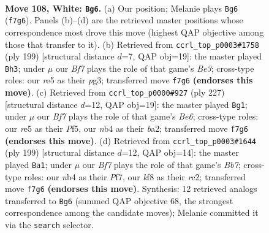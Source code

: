 \documentclass[11pt]{article}
\begin{document}
\clearpage

\begin{figure}[p]\centering
\begin{subfigure}{0.46\textwidth}\centering
\resizebox{\linewidth}{!}{%
\newchessgame
\chessboard[
  setfen={5k2/5B2/8/4r1p1/1n6/6K1/8/8 w - - 0 108},
  showmover=false,
  pgfstyle=straightmove, color=movearrow, markmove={f7-g6}
]}
\caption{}
\end{subfigure}\hfill
\begin{subfigure}{0.46\textwidth}\centering
\resizebox{\linewidth}{!}{%
\newchessgame
\chessboard[
  setfen={8/8/4b1k1/4K3/7P/6P1/7N/8 b - - 84 100},
  showmover=false,
  pgfstyle=straightmove, color=movearrow, markmove={e6-h3}
]}
\caption{}
\end{subfigure}
\\[4pt]
\begin{subfigure}{0.46\textwidth}\centering
\resizebox{\linewidth}{!}{%
\newchessgame
\chessboard[
  setfen={8/4k3/8/4Pp2/8/4bK2/B7/8 b - - 2 114},
  showmover=false,
  pgfstyle=straightmove, color=movearrow, markmove={e3-g1}
]}
\caption{}
\end{subfigure}\hfill
\begin{subfigure}{0.46\textwidth}\centering
\resizebox{\linewidth}{!}{%
\newchessgame
\chessboard[
  setfen={8/5p1k/8/5KP1/8/8/1bR5/8 b - - 54 100},
  showmover=false,
  pgfstyle=straightmove, color=movearrow, markmove={b2-a1}
]}
\caption{}
\end{subfigure}
\caption{\textbf{Move 108, White: \texttt{Bg6}.} (a) Our position; Melanie plays \texttt{Bg6} (\texttt{f7g6}). Panels (b)--(d) are the retrieved master positions whose correspondence most drove this move (highest QAP objective among those that transfer to it). (b) Retrieved from \texttt{ccrl\_top\_p0003\#1758} (ply 199) [structural distance $d$=7, QAP obj=19]: the master played \texttt{Bh3}; under $\mu$ our \emph{Bf7} plays the role of that game's \emph{Be3}; cross-type roles: our \emph{r}e5 as their \emph{p}g3; transferred move \texttt{f7g6} \textbf{(endorses this move)}. (c) Retrieved from \texttt{ccrl\_top\_p0000\#927} (ply 227) [structural distance $d$=12, QAP obj=19]: the master played \texttt{Bg1}; under $\mu$ our \emph{Bf7} plays the role of that game's \emph{Be6}; cross-type roles: our \emph{r}e5 as their \emph{P}f5, our \emph{n}b4 as their \emph{b}a2; transferred move \texttt{f7g6} \textbf{(endorses this move)}. (d) Retrieved from \texttt{ccrl\_top\_p0003\#1644} (ply 199) [structural distance $d$=12, QAP obj=14]: the master played \texttt{Ba1}; under $\mu$ our \emph{Bf7} plays the role of that game's \emph{Bb7}; cross-type roles: our \emph{n}b4 as their \emph{P}f7, our \emph{k}f8 as their \emph{r}c2; transferred move \texttt{f7g6} \textbf{(endorses this move)}. Synthesis: 12 retrieved analogs transferred to \texttt{Bg6} (summed QAP objective 68, the strongest correspondence among the candidate moves); Melanie committed it via the \texttt{search} selector.}
\label{fig:thought-m214}
\end{figure}
\end{document}
